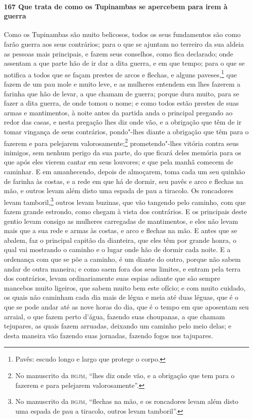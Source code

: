\begin{linenumbers}
\paragraph{167 Que trata de como os Tupinambas se apercebem para irem à guerra}\quad
Como os Tupinambas são muito belicosos, todos os seus fundamentos são como farão guerra
aos seus contrários; para o que se ajuntam no terreiro da sua aldeia as pessoas mais
principais, e fazem seus conselhos, como fica declarado; onde assentam a que parte hão de
ir dar a dita guerra, e em que tempo; para o que se notifica a todos que se façam prestes
de arcos e flechas, e alguns paveses,\footnote{ Pavês: escudo longo e largo que protege o
corpo.} que fazem de um pau mole e muito leve, e as mulheres entendem em lhes fazerem a
farinha que hão de levar, a que chamam de guerra; porque dura muito, para se fazer a dita
guerra, de onde tomou o nome; e como todos estão prestes de suas armas e mantimentos, à
noite antes da partida anda o principal pregando ao redor das casas, e nesta pregação lhes
diz onde vão, e a obrigação que têm de ir tomar vingança de seus contrários, pondo"-lhes
diante a obrigação que têm para o fazerem e para pelejarem valorosamente;\footnote{ No
manuscrito da \textsc{bgjm}, ``lhes diz onde vão, e a obrigação que tem para o fazerem e
para pelejarem valorosamente''.} prometendo"-lhes vitória contra seus inimigos, sem nenhum
perigo da sua parte, do que ficará deles memória para os que após eles vierem cantar em
seus louvores; e que pela manhã comecem de caminhar. E em amanhecendo, depois de
almoçarem, toma cada um seu quinhão de farinha às costas, e a rede em que há de dormir,
seu pavês e arco e flechas na mão, e outros levam além disto uma espada de pau a tiracolo.
Os roncadores levam tamboril,\footnote{ No manuscrito da \textsc{bgjm}, ``flechas na mão,
e os roncadores levam além disto uma espada de pau a tiracolo, outros levam tamboril''.}
outros levam buzinas, que vão tangendo pelo caminho, com que fazem grande estrondo, como
chegam à vista dos contrários. E os principais deste gentio levam consigo as mulheres
carregadas de mantimentos, e eles não levam mais que a sua rede e armas às costas, e arco
e flechas na mão. E antes que se abalem, faz o principal capitão da dianteira, que eles
têm por grande honra, o qual vai mostrando o caminho e o lugar onde hão de dormir cada
noite. E a ordenança com que se põe a caminho, é um diante do outro, porque não sabem
andar de outra maneira; e como saem fora dos seus limites, e entram pela terra dos
contrários, levam ordinariamente suas espias adiante que são sempre mancebos muito
ligeiros, que sabem muito bem este ofício; e com muito cuidado, os quais não caminham cada
dia mais de légua e meia até duas léguas, que é o que se pode andar até as nove horas do
dia, que é o tempo em que aposentam seu arraial, o que fazem perto d'água, fazendo suas
choupanas, a que chamam tejupares, as quais fazem arruadas, deixando um caminho pelo meio
delas; e desta maneira vão fazendo suas jornadas, fazendo fogos nos tajupares.


\end{linenumbers}
